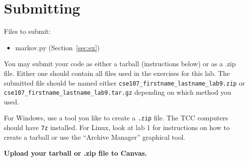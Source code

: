 \documentclass[11pt]{cselabheader}
\begin{document}
\pagebreak
\section{Submitting}

Files to submit:
\begin{itemize}
\item markov.py (Section~\ref{sec:ex})
\end{itemize}

You may submit your code as either a tarball (instructions below) or as a .zip
file. Either one should contain all files used in the exercises for this lab.
The submitted file should be named either
\texttt{cse107\_firstname\_lastname\_lab9.zip} or
\texttt{cse107\_firstname\_lastname\_lab9.tar.gz} depending on which method you
used.

For Windows, use a tool you like to create a \texttt{.zip} file. The TCC
computers should have \texttt{7z} installed. For Linux, look at lab 1 for
instructions on how to create a tarball or use the ``Archive Manager'' graphical
tool.

\begin{center}
  \textbf{Upload your tarball or .zip file to Canvas.}
\end{center}
\end{document}
